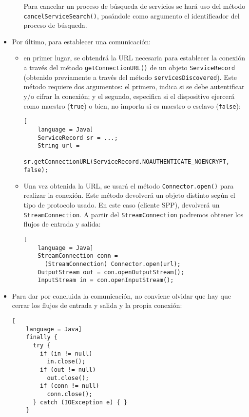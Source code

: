 \begin{itemize}
\begin{itemize}
  Para cancelar un proceso de búsqueda de servicios se hará uso del método
  \texttt{cancelServiceSearch()}, pasándole como argumento el identificador
  del proceso de búsqueda.
  \end{itemize}

\item Por último, para establecer una comunicación:
  \begin{itemize}
  \item en primer lugar, se obtendrá la \acs{URL} necesaria para establecer
  la conexión a través del método \texttt{getConnectionURL()} de un objeto
  \texttt{ServiceRecord} (obtenido previamente a través del método
  \texttt{servicesDiscovered}). Este método requiere dos argumentos: el
  primero, indica si se debe autentificar y/o cifrar la conexión; y el
  segundo, especifica si el dispositivo ejercerá como maestro (\texttt{true})
  o bien, no importa si es maestro o esclavo (\texttt{false}):

  \begin{lstlisting}[
    language = Java]
    ServiceRecord sr = ...;
    String url =
      sr.getConnectionURL(ServiceRecord.NOAUTHENTICATE_NOENCRYPT, false);
  \end{lstlisting}

  \item Una vez obtenida la \acs{URL}, se usará el método
  \texttt{Connector.open()} para realizar la conexión. Este método devolverá un 
  objeto distinto según el tipo de protocolo usado. En este caso (cliente
  \acs{SPP}), devolverá un \texttt{StreamConnection}. A partir del
  \texttt{StreamConnection} podremos obtener los flujos de entrada y salida:

  \begin{lstlisting}[
    language = Java]
    StreamConnection conn =
      (StreamConnection) Connector.open(url);
    OutputStream out = con.openOutputStream();
    InputStream in = con.openInputStream();
  \end{lstlisting}
  \end{itemize}

\item Para dar por concluida la comunicación, no conviene olvidar que hay que 
cerrar los flujos de entrada y salida y la propia conexión:

  \begin{lstlisting}[
    language = Java]
    finally {
      try {
        if (in != null)
          in.close();
        if (out != null)
          out.close();
        if (conn != null)
          conn.close();
      } catch (IOException e) { }
    }
  \end{lstlisting}
\end{itemize}


